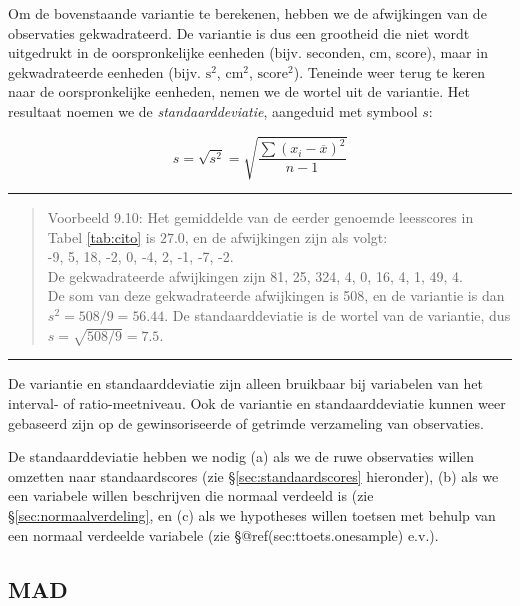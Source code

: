 \documentclass[
]{book}
\begin{document}
Om de bovenstaande variantie te berekenen, hebben we de afwijkingen van
de observaties gekwadrateerd. De variantie is dus een grootheid die niet
wordt uitgedrukt in de oorspronkelijke eenheden (bijv. seconden, cm,
score), maar in gekwadrateerde eenheden (bijv. \(\textrm{s}^2\),
\(\textrm{cm}^2\), \(\textrm{score}^2\)). Teneinde weer terug te keren naar
de oorspronkelijke eenheden, nemen we de wortel uit de variantie. Het
resultaat noemen we de \emph{standaarddeviatie}, aangeduid met symbool \(s\):

\begin{equation}
  s = \sqrt{s^2} = \sqrt{ \frac{ \sum (x_i - \overline{x})^2 } {n-1} }
  \label{eq:standaarddeviatie}
\end{equation}

\begin{center}\rule{0.5\linewidth}{0.5pt}\end{center}

\begin{quote}
Voorbeeld 9.10:
Het gemiddelde van de eerder genoemde leesscores in
Tabel \ref{tab:cito} is
\(27.0\), en de afwijkingen zijn als volgt:\\
-9, 5, 18, -2, 0, -4, 2, -1, -7, -2.\\
De gekwadrateerde afwijkingen zijn 81, 25, 324, 4, 0, 16, 4, 1, 49, 4.\\
De som van deze gekwadrateerde afwijkingen is 508, en de variantie is
dan \(s^2=508/9=56.44\). De standaarddeviatie is de wortel van de
variantie, dus \(s=\sqrt{508/9}=7.5\).
\end{quote}

\begin{center}\rule{0.5\linewidth}{0.5pt}\end{center}

De variantie en standaarddeviatie zijn alleen bruikbaar bij variabelen
van het interval- of ratio-meetniveau. Ook de variantie en
standaarddeviatie kunnen weer gebaseerd zijn op de gewinsoriseerde of
getrimde verzameling van observaties.

De standaarddeviatie hebben we nodig
(a) als we de ruwe observaties
willen omzetten naar standaardscores (zie §\ref{sec:standaardscores} hieronder),
(b) als we een variabele
willen beschrijven die normaal verdeeld is (zie §\ref{sec:normaalverdeling}, en
(c) als we hypotheses willen toetsen met behulp van een normaal verdeelde variabele (zie §@ref(sec:ttoets.onesample) e.v.).

\hypertarget{mad}{%
\subsection{MAD}\label{mad}}
\end{document}
